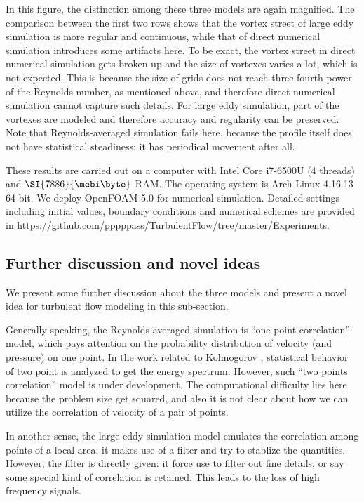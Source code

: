 \documentclass[english, nochinese]{pkupaper}
\begin{document}
In this figure, the distinction among these three models are again magnified. The comparison between the first two rows shows that the vortex street of large eddy simulation is more regular and continuous, while that of direct numerical simulation introduces some artifacts here. To be exact, the vortex street in direct numerical simulation gets broken up and the size of vortexes varies a lot, which is not expected. This is because the size of grids does not reach three fourth power of the Reynolds number, as mentioned above, and therefore direct numerical simulation cannot capture such details. For large eddy simulation, part of the vortexes are modeled and therefore accuracy and regularity can be preserved. Note that Reynolds-averaged simulation fails here, because the profile itself does not have statistical steadiness: it has periodical movement after all.

These results are carried out on a computer with Intel Core i7-6500U (4 threads) and $\SI{7886}{\mebi\byte}$ RAM. The operating system is Arch Linux 4.16.13 64-bit. We deploy OpenFOAM 5.0 \parencite{weller_tensorial_1998} for numerical simulation. Detailed settings including initial values, boundary conditions and numerical schemes are provided in \url{https://github.com/pppppass/TurbulentFlow/tree/master/Experiments}.

\subsection{Further discussion and novel ideas}

We present some further discussion about the three models and present a novel idea for turbulent flow modeling in this sub-section.

Generally speaking, the Reynolds-averaged simulation is ``one point correlation'' model, which pays attention on the probability distribution of velocity (and pressure) on one point. In the work related to Kolmogorov \parencite{kolmogorov_equations_1941} \parencite{sreenivasan_universality_1995} \parencite{pope_turbulent_2001}, statistical behavior of two point is analyzed to get the energy spectrum. However, such ``two points correlation'' model is under development. The computational difficulty lies here because the problem size get squared, and also it is not clear about how we can utilize the correlation of velocity of a pair of points.

In another sense, the large eddy simulation model emulates the correlation among points of a local area: it makes use of a filter and try to stablize the quantities. However, the filter is directly given: it force use to filter out fine details, or say some special kind of correlation is retained. This leads to the loss of high frequency signals.
\end{document}
